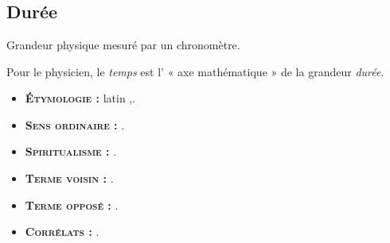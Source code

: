\chapter{}
\section{Durée}

Grandeur physique mesuré par un chronomètre.


Pour le physicien, le {\it temps} est l' « axe mathématique »
de la grandeur {\it durée}.



{\footnotesize
\begin{itemize}[leftmargin=1cm, label=, itemsep=1pt]
\item {\bf \textsc{Étymologie} :} latin {\it },.
\item {\bf \textsc{Sens ordinaire} :} .
\item {\bf \textsc{Spiritualisme} :} .
\end{itemize}

\begin{itemize}[leftmargin=1cm, label=, itemsep=1pt]
\item {\bf \textsc{Terme voisin} :} .
\item {\bf \textsc{Terme opposé} :} .
\item {\bf \textsc{Corrélats} :} .
\end{itemize}
}
